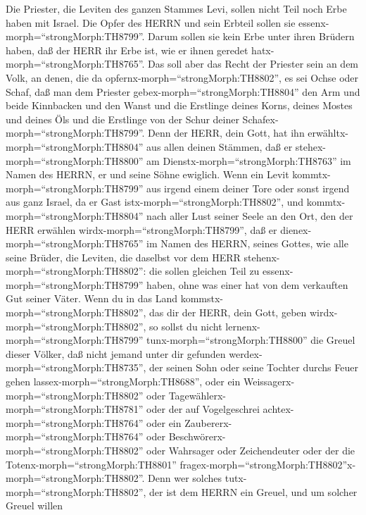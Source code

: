 Die Priester, die Leviten des ganzen Stammes Levi, sollen
nicht Teil noch Erbe haben mit Israel. Die Opfer des HERRN und sein
Erbteil sollen sie essenx-morph=``strongMorph:TH8799''. 
Darum sollen sie kein Erbe unter ihren Brüdern haben, daß der HERR ihr
Erbe ist, wie er ihnen geredet hatx-morph=``strongMorph:TH8765''.
 Das soll aber das Recht der Priester sein an dem Volk, an
denen, die da opfernx-morph=``strongMorph:TH8802'', es sei Ochse oder
Schaf, daß man dem Priester gebex-morph=``strongMorph:TH8804'' den Arm
und beide Kinnbacken und den Wanst  und die Erstlinge deines
Korns, deines Mostes und deines Öls und die Erstlinge von der Schur
deiner Schafex-morph=``strongMorph:TH8799''.  Denn der HERR,
dein Gott, hat ihn erwähltx-morph=``strongMorph:TH8804'' aus allen
deinen Stämmen, daß er stehex-morph=``strongMorph:TH8800'' am
Dienstx-morph=``strongMorph:TH8763'' im Namen des HERRN, er und seine
Söhne ewiglich.  Wenn ein Levit
kommtx-morph=``strongMorph:TH8799'' aus irgend einem deiner Tore oder
sonst irgend aus ganz Israel, da er Gast
istx-morph=``strongMorph:TH8802'', und
kommtx-morph=``strongMorph:TH8804'' nach aller Lust seiner Seele an den
Ort, den der HERR erwählen wirdx-morph=``strongMorph:TH8799'',
 daß er dienex-morph=``strongMorph:TH8765'' im Namen des
HERRN, seines Gottes, wie alle seine Brüder, die Leviten, die daselbst
vor dem HERR stehenx-morph=``strongMorph:TH8802'':  die
sollen gleichen Teil zu essenx-morph=``strongMorph:TH8799'' haben, ohne
was einer hat von dem verkauften Gut seiner Väter.  Wenn du
in das Land kommstx-morph=``strongMorph:TH8802'', das dir der HERR, dein
Gott, geben wirdx-morph=``strongMorph:TH8802'', so sollst du nicht
lernenx-morph=``strongMorph:TH8799'' tunx-morph=``strongMorph:TH8800''
die Greuel dieser Völker,  daß nicht jemand unter dir
gefunden werdex-morph=``strongMorph:TH8735'', der seinen Sohn oder seine
Tochter durchs Feuer gehen lassex-morph=``strongMorph:TH8688'', oder ein
Weissagerx-morph=``strongMorph:TH8802'' oder
Tagewählerx-morph=``strongMorph:TH8781'' oder der auf Vogelgeschrei
achtex-morph=``strongMorph:TH8764'' oder ein
Zaubererx-morph=``strongMorph:TH8764''  oder
Beschwörerx-morph=``strongMorph:TH8802'' oder Wahrsager oder
Zeichendeuter oder der die Totenx-morph=``strongMorph:TH8801''
fragex-morph=``strongMorph:TH8802''x-morph=``strongMorph:TH8802''.
 Denn wer solches tutx-morph=``strongMorph:TH8802'', der
ist dem HERRN ein Greuel, und um solcher Greuel willen
